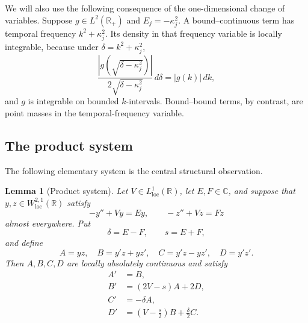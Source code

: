 \documentclass[11pt]{amsart}
\newtheorem{lemma}[theorem]{Lemma}
\numberwithin{equation}{section}
\theoremstyle{remark}
\newcommand{\R}{\mathbb R}
\newcommand{\C}{\mathbb C}
\begin{document}
We will also use the following consequence of the one-dimensional change of
variables.  Suppose
$g\in L^2(\R_+)$ and $E_j=-\kappa_j^2$.  A bound--continuous term has temporal
frequency $k^2+\kappa_j^2$.  Its density in that frequency variable is locally
integrable, because under $\delta=k^2+\kappa_j^2$,
\[
 \frac{|g(\sqrt{\delta-\kappa_j^2})|}
      {2\sqrt{\delta-\kappa_j^2}}\,d\delta
 =|g(k)|\,dk,
\]
and $g$ is integrable on bounded $k$-intervals.  Bound--bound terms, by
contrast, are point masses in the temporal-frequency variable.

\subsection{The product system}

The following elementary system is the central structural observation.

\begin{lemma}[Product system]\label{lem:product-system}
Let $V\in L^1_{\mathrm{loc}}(\R)$, let $E,F\in\C$, and suppose that
$y,z\in W^{2,1}_{\mathrm{loc}}(\R)$ satisfy
\[
 -y''+Vy=Ey,
 \qquad
 -z''+Vz=Fz
\]
almost everywhere.  Put
\[
 \delta=E-F,
 \qquad
 s=E+F,
\]
and define
\begin{equation}
 A=yz,
 \quad
 B=y'z+yz',
 \quad
 C=y'z-yz',
 \quad
 D=y'z'.
 \label{eq:product-state-definition}
\end{equation}
Then $A,B,C,D$ are locally absolutely continuous and satisfy
\begin{equation}
 \boxed{
 \begin{aligned}
 A'&=B,\\
 B'&=(2V-s)A+2D,\\
 C'&=-\delta A,\\
 D'&=\left(V-\frac{s}{2}\right)B+\frac{\delta}{2}C.
 \end{aligned}}
 \label{eq:product-system}
\end{equation}
\end{lemma}
\end{document}
